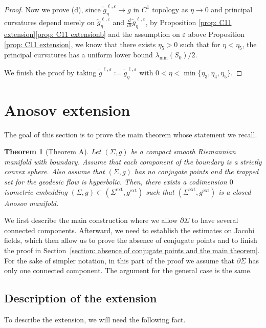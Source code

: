 \documentclass[10pt]{amsart}
\newcommand{\ext}{\mathrm{ext}}
\newtheorem{theorem}{Theorem}[section]
\theoremstyle{definition}
\let\eps\varepsilon
\renewcommand{\>}{{\rangle}}
\newcommand{\<}{{\langle}}
\begin{document}
\begin{proof}
Now we prove (d), since $\tilde{g}^{\ell,\eps}_{\eta}\to g$ in $C^1$ topology as $\eta\to 0$ and principal curvatures depend merely on $\tilde{g}^{\ell,\eps}_{\eta}$ and $\frac{d}{dt}\tilde{g}^{\ell,\eps}_{\eta}$, by Proposition \ref{prop: C11 extension}\eqref{prop: C11 extensionb} and the assumption on $\eps$ above Proposition \ref{prop: C11 extension}, we know that there exists $\eta_5>0$ such that for $\eta<\eta_5$, the principal curvatures has a uniform lower bound $\lambda_{\min}(S_0)/2$.

We finish the proof by taking $\tilde{g}^{\ell,\eps}:=\tilde{g}^{\ell,\eps}_{\eta}$ with $0<\eta<\min\{\eta_3, \eta_4, \eta_5\}$.
\end{proof}

\section{Anosov extension}\label{sec: anosov_ext}

The goal of this section is to prove the main theorem whose statement we recall.

\begin{theorem}[Theorem A]\label{thm_anosov_ext}
Let $(\Sigma, g)$ be a compact smooth Riemannian manifold with boundary. Assume that each component of the boundary is a strictly convex sphere. Also assume that $(\Sigma, g)$ has no conjugate points and the trapped set for the geodesic flow is hyperbolic. Then, there exists a codimension $0$ isometric embedding $(\Sigma,g)\subset (\Sigma^{\ext}, g^{\ext})$ such that $(\Sigma^{\ext}, g^{\ext})$ is a closed Anosov manifold.
\end{theorem}

We first describe the main construction where we allow $\partial\Sigma$ to have several connected components. Afterward, we need to establish the estimates on Jacobi fields, which then allow us to prove the absence of conjugate points and to finish the proof in Section~\ref{section: absence of conjugate points and the main theorem}. For the sake of simpler notation, in this part of the proof we assume that $\partial\Sigma$ has only one connected component. The argument for the general case is the same.

\subsection{Description of the extension}\label{subsec: description}

To describe the extension, we will need the following fact.
\end{document}
